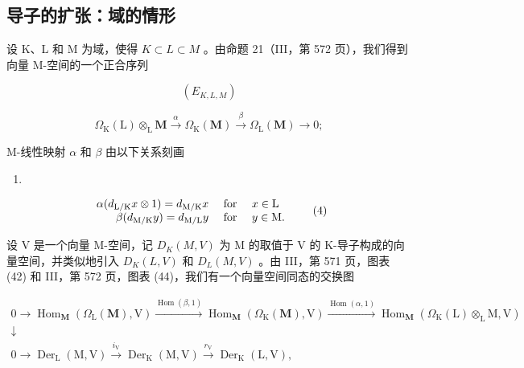 \subsection{导子的扩张：域的情形}

设 K、L 和 M 为域，使得 \(K \subset L \subset M\) 。由命题 21（III，第 572 页），我们得到向量 M-空间的一个正合序列

\[
(E _ {K, L, M})
\]

\[
\Omega_ {\mathrm{K}} (\mathrm{L}) \otimes_ {\mathrm{L}} \mathbf {M} \xrightarrow {\alpha} \Omega_ {\mathrm{K}} (\mathbf {M}) \xrightarrow {\beta} \Omega_ {\mathrm{L}} (\mathbf {M}) \to 0;
\]

M-线性映射 \(\alpha\) 和 \(\beta\) 由以下关系刻画

\begin{enumerate}
\def\labelenumi{(\arabic{enumi})}
\setcounter{enumi}{2}
\tightlist
\item
\end{enumerate}

\[
\begin{array}{r l} \alpha (d _ {\mathrm{L/K}} x \otimes 1) = d _ {\mathrm{M/K}} x & \text { for } \quad x \in \mathrm{L} \\ \beta (d _ {\mathrm{M/K}} y) = d _ {\mathrm{M/L}} y & \text { for } \quad y \in \mathrm{M}. \end{array}\tag{4}
\]

设 V 是一个向量 M-空间，记 \(D_{K}(M,V)\) 为 M 的取值于 V 的 K-导子构成的向量空间，并类似地引入 \(D_{K}(L,V)\) 和 \(D_{L}(M,V)\) 。由 III，第 571 页，图表 (42) 和 III，第 572 页，图表 (44)，我们有一个向量空间同态的交换图

\[
\begin{array}{l}0 \rightarrow \operatorname{Hom} _ {\mathbf {M}} (\Omega_ {\mathrm{L}} (\mathbf {M}), \mathrm{V}) \xrightarrow {\operatorname{Hom} (\beta , 1)} \operatorname{Hom} _ {\mathbf {M}} (\Omega_ {\mathrm{K}} (\mathbf {M}), \mathrm{V}) \xrightarrow {\operatorname{Hom} (\alpha , 1)} \operatorname{Hom} _ {\mathbf {M}} (\Omega_ {\mathrm{K}} (\mathrm{L}) \otimes_ {\mathrm{L}} \mathrm{M}, \mathrm{V})\\\downarrow\\0 \rightarrow \operatorname{Der} _ {\mathrm{L}} (\mathrm{M}, \mathrm{V}) \xrightarrow {i _ {\mathrm{V}}} \operatorname{Der} _ {\mathrm{K}} (\mathrm{M}, \mathrm{V}) \xrightarrow {r _ {\mathrm{V}}} \operatorname{Der} _ {\mathrm{K}} (\mathrm{L}, \mathrm{V}),\end{array}
\]

